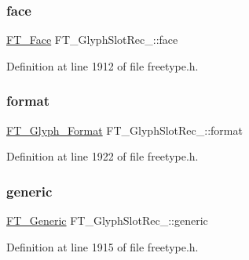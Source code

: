 \mbox{\label{struct_f_t___glyph_slot_rec___a0f5dbaf7d539bf2d92ecdff740342b04}} 
\subsubsection{\texorpdfstring{face}{face}}
{\footnotesize\ttfamily \mbox{\hyperlink{freetype_8h_a7eba045ee20968354fa1bff0f69740fa}{F\+T\+\_\+\+Face}} F\+T\+\_\+\+Glyph\+Slot\+Rec\+\_\+\+::face}



Definition at line 1912 of file freetype.\+h.

\mbox{\label{struct_f_t___glyph_slot_rec___afcd35188ff4c3d5cbb518602d05b2807}} 
\subsubsection{\texorpdfstring{format}{format}}
{\footnotesize\ttfamily \mbox{\hyperlink{ftimage_8h_aeca0d10a27aedecbf96515e0628aff1f}{F\+T\+\_\+\+Glyph\+\_\+\+Format}} F\+T\+\_\+\+Glyph\+Slot\+Rec\+\_\+\+::format}



Definition at line 1922 of file freetype.\+h.

\mbox{\label{struct_f_t___glyph_slot_rec___ac2d04848997fba660e17bc00760ef14f}} 
\subsubsection{\texorpdfstring{generic}{generic}}
{\footnotesize\ttfamily \mbox{\hyperlink{fttypes_8h_ae15e8550dd7d863328686aadaead5c77}{F\+T\+\_\+\+Generic}} F\+T\+\_\+\+Glyph\+Slot\+Rec\+\_\+\+::generic}



Definition at line 1915 of file freetype.\+h.

\mbox{\label{struct_f_t___glyph_slot_rec___a91731fd527eeab1d1acf3e1aea4bea84}} 
